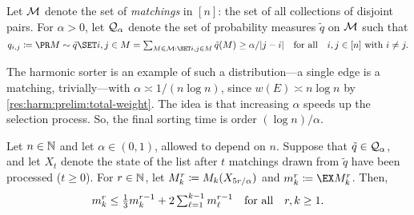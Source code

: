 \documentclass{article}
\begin{document}
\begin{defn}
Let $\mathcal{M}$ denote the set of \textit{matchings} in $[n]$:
	the set of all collections of disjoint pairs.
For $\alpha > 0$, let $\mathcal{Q}_\alpha$ denote the set of probability measures $\tilde q$ on $\mathcal{M}$ such that
\[
	q_{i,j}
\cq
	\pr[M\sim \tilde q]{ \set{i,j} \in M }
=
	\sumt{M \in \mcm : \set{i,j} \in M}
	\tilde q(M)
\ge
	\alpha / \abs{j - i}
\Qforall
	i,j \in [n]
\text{ with }
	i \ne j.
\]
\end{defn}

The harmonic sorter is an example of such a distribution---a single edge is a matching, trivially---with $\alpha \asymp 1/(n \log n)$, since $w(E) \asymp n \log n$ by \cref{res:harm:prelim:total-weight}.
The idea is that increasing $\alpha$ speeds up the selection process.
So, the final sorting time is order $(\log n) / \alpha$.

\begin{prop}
\label{res:harm:par:rr:derivation}
Let $n \in \mathbb{N}$ and let $\alpha \in (0,1)$, allowed to depend on $n$.
Suppose that $\tilde q \in \mathcal{Q}_\alpha$, and let $X_t$ denote the state of the list after $t$ matchings drawn from $\tilde q$ have been processed ($t \ge 0$).
For $r \in \mathbb{N}$, let $M_k^r \coloneqq M_k(X_{5 r / \alpha})$ and $m_k^r \cq \ex{M_k^r}$.
Then,
\[
	m_k^r
\le
	\tfrac13
	m_k^{r-1}
+	2
	\sumt{\ell=1}[k-1]
	m_\ell^{r-1}
\Qforall
	r,k \ge 1.
\]
\end{prop}
\end{document}
